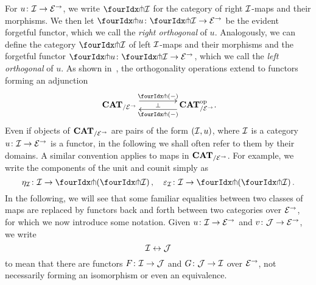 \documentclass[reqno,10pt,a4paper,oneside,draft]{amsart}
\begin{document}
{{For $u \co \cal{I} \to \catE^\to$, we write $\liftr{\cal{I}}$ for the category of right $\cal{I}$-maps and their morphisms.
We then let $\liftr{u} \co \liftr{\cal{I}} \to \catE^\to$ be the evident forgetful functor, which we call the \emph{right orthogonal} of $u$. Analogously, we can define the category $\liftl{\cal{I}}$  of left $\cal{I}$-maps and their morphisms
and the forgetful functor $\liftl{u} \co \liftl{\cal{I}} \to \cal{E}^\to$, which we call the \emph{left orthogonal} of $u$.
As shown in~\cite[Proposition~3.8]{garner:small-object-argument}, the orthogonality operations
extend to functors forming an adjunction
\begin{equation} \label{garner-adjunction}
\begin{gathered}
\xymatrix@C+2em{
  \CAT_{/\catE^\to}
  \ar@<5pt>[r]^-{\liftl{\brarghole}}
  \ar@{}[r]|-{\bot}
&
  \CAT_{/\catE^\to}^{\op}
  \ar@<5pt>[l]^-{\liftr{\brarghole}}
\rlap{.}}
\end{gathered}
\end{equation}
Even if objects of $\CAT_{/\catE^\to}$ are pairs of the form $(\cal{I}, u)$, where $\cal{I}$ is a category $u \co
\cal{I} \to \catE^\to$ is a functor, in the following we shall often refer to them by their domains.
A similar convention applies to maps in $\CAT_{/\catE^\to}$.
For example, we write the components of the unit and counit simply as
\[
\eta_\cal{I} \co \cal{I} \to \liftl{(\liftr{\cal{I}})}
\, , \quad
\varepsilon_\cal{I} \co \cal{I} \to \liftr{(\liftl{\cal{I}})}
\, .\]
In the following, we will see that some familiar equalities between two classes of maps are replaced by functors back and forth between two categories over $\cal{E}^\to$, for which we now introduce some notation.
Given $u \co \cal{I} \to \cal{E}^\to$ and $v \co \cal{J} \to \cal{E}^\to$, we write
\begin{equation} \label{equ:logical-equivalence}
\cal{I} \leftrightarrow \cal{J}
\end{equation}
to mean that there are functors $F \co \cal{I} \to \cal{J}$ and $G \co \cal{J} \to \cal{I}$ over $\cal{E}^\to$, not
necessarily forming an isomorphism or even an equivalence. 

}}
\end{document}
